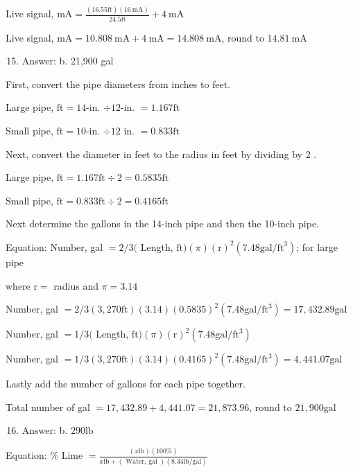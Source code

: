 \documentclass[10pt]{article}
\begin{document}
Live signal, $\mathrm{mA}=\frac{(16.55 \mathrm{ft})(16 \mathrm{~mA})}{24.5 \mathrm{ft}}+4 \mathrm{~mA}$

Live signal, $\mathrm{mA}=10.808 \mathrm{~mA}+4 \mathrm{~mA}=14.808 \mathrm{~mA}$, round to $14.81 \mathrm{~mA}$

\begin{enumerate}
  \setcounter{enumi}{14}
  \item Answer: b. 21,900 gal
\end{enumerate}

First, convert the pipe diameters from inches to feet.

Large pipe, $\mathrm{ft}=14$-in. $\div 12$-in. $=1.167 \mathrm{ft}$

Small pipe, $\mathrm{ft}=10$-in. $\div 12$ in. $=0.833 \mathrm{ft}$

Next, convert the diameter in feet to the radius in feet by dividing by 2 .

Large pipe, $\mathrm{ft}=1.167 \mathrm{ft} \div 2=0.5835 \mathrm{ft}$

Small pipe, $\mathrm{ft}=0.833 \mathrm{ft} \div 2=0.4165 \mathrm{ft}$

Next determine the gallons in the 14-inch pipe and then the 10-inch pipe.

Equation: Number, gal $=2 / 3($ Length, $\mathrm{ft})(\pi)(\mathrm{r})^{2}\left(7.48 \mathrm{gal} / \mathrm{ft}^{3}\right)$; for large pipe

where $\mathrm{r}=$ radius and $\pi=3.14$

Number, gal $=2 / 3(3,270 \mathrm{ft})(3.14)(0.5835)^{2}\left(7.48 \mathrm{gal} / \mathrm{ft}^{3}\right)=17,432.89 \mathrm{gal}$

Number, gal $=1 / 3($ Length, $\mathrm{ft})(\pi)(\mathrm{r})^{2}\left(7.48 \mathrm{gal} / \mathrm{ft}^{3}\right)$

Number, gal $=1 / 3(3,270 \mathrm{ft})(3.14)(0.4165)^{2}\left(7.48 \mathrm{gal} / \mathrm{ft}^{3}\right)=4,441.07 \mathrm{gal}$

Lastly add the number of gallons for each pipe together.

Total number of gal $=17,432.89+4,441.07=21,873.96$, round to $21,900 \mathrm{gal}$

\begin{enumerate}
  \setcounter{enumi}{15}
  \item Answer: b. $290 \mathrm{lb}$
\end{enumerate}

Equation: \% Lime $=\frac{(x \mathrm{lb})(100 \%)}{x \mathrm{lb}+(\text { Water, gal })(8.34 \mathrm{lb} / \mathrm{gal})}$
\end{document}
